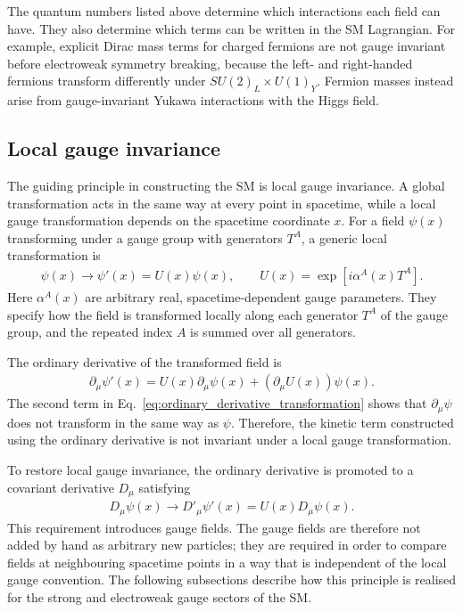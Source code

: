 \begin{table}[htbp]
{\begin{tabular}{ccccccccc}
        \bottomrule
    \end{tabular}
    }
\end{table}

The quantum numbers listed above determine which interactions each field can have. 
They also determine which terms can be written in the SM Lagrangian. 
For example, explicit Dirac mass terms for charged fermions are not gauge invariant before electroweak symmetry breaking, because the left- and right-handed fermions transform differently under $SU(2)_{L}\times U(1)_{Y}$. 
Fermion masses instead arise from gauge-invariant Yukawa interactions with the Higgs field.


\subsection{Local gauge invariance}
\label{subsec:local_gauge_invariance}

The guiding principle in constructing the SM is local gauge invariance. 
A global transformation acts in the same way at every point in spacetime, while a local gauge transformation depends on the spacetime coordinate $x$. 
For a field $\psi(x)$ transforming under a gauge group with generators $T^{A}$, a generic local transformation is
\begin{align}
    \psi(x)
    \rightarrow
    \psi'(x)
    =
    U(x)\psi(x),
    \qquad
    U(x)
    =
    \exp\left[i\alpha^{A}(x)T^{A}\right].
    \label{eq:generic_local_transformation}
\end{align}
Here $\alpha^{A}(x)$ are arbitrary real, spacetime-dependent gauge parameters. 
They specify how the field is transformed locally along each generator $T^{A}$ of the gauge group, and the repeated index $A$ is summed over all generators.

The ordinary derivative of the transformed field is
\begin{align}
    \partial_{\mu}\psi'(x)
    =
    U(x)\partial_{\mu}\psi(x)
    +
    \left(\partial_{\mu}U(x)\right)\psi(x).
    \label{eq:ordinary_derivative_transformation}
\end{align}
The second term in Eq.~\eqref{eq:ordinary_derivative_transformation} shows that $\partial_{\mu}\psi$ does not transform in the same way as $\psi$. 
Therefore, the kinetic term constructed using the ordinary derivative is not invariant under a local gauge transformation.

To restore local gauge invariance, the ordinary derivative is promoted to a covariant derivative $D_{\mu}$ satisfying
\begin{align}
    D_{\mu}\psi(x)
    \rightarrow
    D'_{\mu}\psi'(x)
    =
    U(x)D_{\mu}\psi(x).
    \label{eq:covariant_derivative_requirement}
\end{align}
This requirement introduces gauge fields. 
The gauge fields are therefore not added by hand as arbitrary new particles; they are required in order to compare fields at neighbouring spacetime points in a way that is independent of the local gauge convention. 
The following subsections describe how this principle is realised for the strong and electroweak gauge sectors of the SM.


